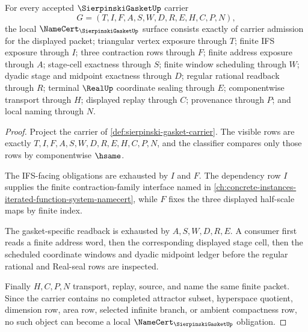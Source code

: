 \begin{theorem}
\label{thm:sierpinski-gasket-namecert-obligations}
For every accepted $\SierpinskiGasketUp$ carrier
$$
G=(T,I,F,A,S,W,D,R,E,H,C,P,N),
$$
the local $\NameCert_{\SierpinskiGasketUp}$ surface consists exactly of carrier admission for the displayed packet; triangular vertex exposure through $T$; finite IFS exposure through $I$; three contraction rows through $F$; finite address exposure through $A$; stage-cell exactness through $S$; finite window scheduling through $W$; dyadic stage and midpoint exactness through $D$; regular rational readback through $R$; terminal $\RealUp$ coordinate sealing through $E$; componentwise transport through $H$; displayed replay through $C$; provenance through $P$; and local naming through $N$.
\end{theorem}
\begin{proof}
Project the carrier of \autoref{def:sierpinski-gasket-carrier}. The visible rows are exactly $T,I,F,A,S,W,D,R,E,H,C,P,N$, and the classifier compares only those rows by componentwise $\hsame$.

The IFS-facing obligations are exhausted by $I$ and $F$. The dependency row $I$ supplies the finite contraction-family interface named in \autoref{ch:concrete-instances-iterated-function-system-namecert}, while $F$ fixes the three displayed half-scale maps by finite index.

The gasket-specific readback is exhausted by $A,S,W,D,R,E$. A consumer first reads a finite address word, then the corresponding displayed stage cell, then the scheduled coordinate windows and dyadic midpoint ledger before the regular rational and Real-seal rows are inspected.

Finally $H,C,P,N$ transport, replay, source, and name the same finite packet. Since the carrier contains no completed attractor subset, hyperspace quotient, dimension row, area row, selected infinite branch, or ambient compactness row, no such object can become a local $\NameCert_{\SierpinskiGasketUp}$ obligation.
\end{proof}

